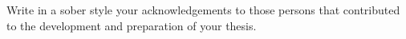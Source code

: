 Write in a sober style your acknowledgements to those persons that contributed to the development and preparation of your thesis.

